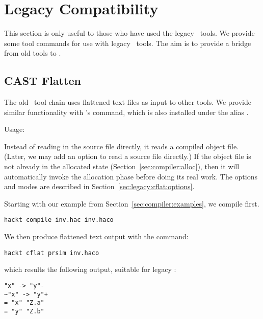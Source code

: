 
\chapter{Legacy Compatibility}
\label{sec:legacy}

This section is only useful to those who have used the legacy \CAST\ tools.  
We provide some tool commands for use with legacy \CAST\ tools.  
The aim is to provide a bridge from old tools to \hackt.  

\section{CAST Flatten}
\label{sec:legacy:cflat}

The old \CAST\ tool chain uses flattened text files as input to other tools.  
We provide similar functionality with \binhackt's  command, 
which is also installed under the alias .  

Usage:
\binhackt\   \ttt{[}\ttt{]} 

Instead of reading in the source file directly, it reads a compiled
object file.  
(Later, we may add an option to read a source file directly.)
If the object file is not already in the allocated state
(Section~\ref{sec:compiler:alloc}), then it will automatically
invoke the allocation phase before doing its real work.  
The options and modes are described in 
Section~\ref{sec:legacy:cflat:options}.  

Starting with our example from Section~\ref{sec:compiler:examples}, 
we compile  first.  

\medskip
\begin{verbatim}
hackt compile inv.hac inv.haco
\end{verbatim}

We then produce flattened text output with the command:

\medskip
\begin{verbatim}
hackt cflat prsim inv.haco
\end{verbatim}

\noindent
which results the following output, suitable for legacy :

\begin{verbatim}
"x" -> "y"-
~"x" -> "y"+
= "x" "Z.a"
= "y" "Z.b"
\end{verbatim}

